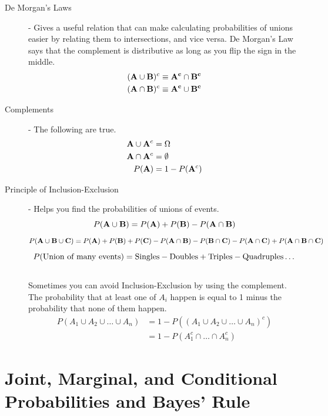 \documentclass[11pt]{article}
\begin{document}
  \begin{description}

    \item[De Morgan's Laws] - Gives a useful relation that can make calculating probabilities of unions easier by relating them to intersections, and vice versa. De Morgan's Law says that the complement is distributive as long as you flip the sign in the middle.
       \begin{align*}
    ({\bf A} \cup {\bf B})^c \equiv {\bf A^c} \cap {\bf B^c} \\
    ({\bf A} \cap {\bf B})^c \equiv {\bf A^c} \cup {\bf B^c}
       \end{align*}

    \item[Complements] - The following are true.
       \begin{align*}
       {\bf A} \cup {\bf A}^c &= \Omega \\
       {\bf A} \cap {\bf A}^c &= \emptyset\\
       P({\bf A}) &= 1 -  P({\bf A}^c)
       \end{align*}

    \item[Principle of Inclusion-Exclusion] - Helps you find the probabilities of unions of events.
    \[ P ({\bf A} \cup {\bf B}) = P({\bf A}) + P({\bf B}) - P({\bf A} \cap {\bf B}) \]
    \[ P ({\bf A} \cup {\bf B} \cup {\bf C}) = P({\bf A}) + P({\bf B}) + P({\bf C}) - P({\bf A} \cap {\bf B}) - P({\bf B} \cap {\bf C}) - P({\bf A} \cap {\bf C}) + P({\bf A} \cap {\bf B} \cap {\bf C})\]
    \[P(\textnormal{Union of many events}) = \textnormal{Singles} - \textnormal{Doubles} + \textnormal{Triples} - \textnormal{Quadruples} \dots \] \\
Sometimes you can avoid Inclusion-Exclusion by using the complement. The probability that at least one of $A_i$ happen is equal to 1 minus the probability that none of them happen.
    \begin{align*}
      P(A_1 \cup A_2 \cup \dots \cup A_n) &= 1 - P((A_1 \cup A_2 \cup \dots \cup A_n)^c) \\
      &= 1 - P(A_1^c \cap \dots \cap A_n^c)
    \end{align*}

  \end{description}

\section*{Joint, Marginal, and Conditional Probabilities and Bayes' Rule}
\end{document}
